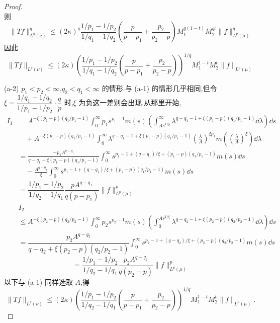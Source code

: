 \begin{proof}
\begin{equation*}
\end{equation*}
则
\begin{equation*}
\| Tf \|_{L^{q}(\nu)}^{q} \leq (2\kappa)^{q}\frac{1/p_{1} - 1/p_{2}}{1/q_{1} - 1/q_{2}}\left(\frac{p}{p - p_{1}} + \frac{p_{2}}{p_{2} - p}\right)M_{1}^{q(1-t)}M_{2}^{qt}\| f \|_{L^{p}(\mu)}^{q}
\end{equation*}
因此
\begin{equation*}
\| Tf \|_{L^{q}(\nu)} \leq (2\kappa)\left(\frac{1/p_{1} - 1/p_{2}}{1/q_{1} - 1/q_{2}}\left(\frac{p}{p - p_{1}} + \frac{p_{2}}{p_{2} - p}\right)\right)^{1/q}M_{1}^{1-t}M_{2}^{t}\| f \|_{L^{p}(\mu)}
\end{equation*}

(a-2) $p_{1} < p_{2} < \infty$,$q_{2} < q_{1} < \infty$ 的情形.与 (a-1) 的情形几乎相同,但令 $\xi = \dfrac{1/q_{1} - 1/q_{2}}{1/p_{1} - 1/p_{2}}\cdot\dfrac{q}{p}$ 时,$\xi$ 为负这一差别会出现.从那里开始,
\begin{align*}
I_{1}&= A^{-\xi(p_{1}-p)(q_{1}/p_{1}-1)}\displaystyle\int_{0}^{\infty}p_{1}s^{p_{1}-1}m(s)\left(\int_{As^{1/\xi}}^{\infty}\lambda^{q-q_{1}-1+\xi(p_{1}-p)(q_{1}/p_{1}-1)}\dd \lambda\right)\dd s  \\
&\quad + A^{-\xi(p_{1}-p)(q_{1}/p_{1}-1)}\displaystyle\int_{0}^{\infty}\lambda^{q-q_{1}-1+\xi(p_{1}-p)(q_{1}/p_{1}-1)}\left(\frac{\lambda}{A}\right)^{\xi p_{1}}m\left(\left(\frac{\lambda}{A}\right)^{\xi}\right)\dd \lambda \\
&= \frac{-p_{1}A^{q-q_{1}}}{q - q_{1} + \xi(p_{1}-p)(q_{1}/p_{1}-1)}\displaystyle\int_{0}^{\infty}s^{p_{1}-1+(q-q_{1})/\xi+(p_{1}-p)(q_{1}/p_{1}-1)}m(s)\dd s \\
&\quad - \frac{A^{q-q_{1}}}{\xi}\displaystyle\int_{0}^{\infty}s^{p_{1}-1+(q-q_{1})/\xi+(p_{1}-p)(q_{1}/p_{1}-1)}m(s)\dd s \\
&= \dfrac{1/p_{1} - 1/p_{2}}{1/q_{2} - 1/q_{1}}\dfrac{pA^{q-q_{1}}}{q(p - p_{1})}\| f \|_{L^{p}(\mu)}^{p}. \\
&I_{2} \\
&\leq A^{-\xi(p_{2}-p)(q_{2}/p_{2}-1)}\displaystyle\int_{0}^{\infty}p_{2}s^{p_{2}-1}m(s)\left(\int_{0}^{As^{1/\xi}}\lambda^{q-q_{2}-1+\xi(p_{2}-p)(q_{2}/p_{2}-1)}\dd \lambda\right)\dd s \\
&= \dfrac{p_{2}A^{q-q_{2}}}{q - q_{2} + \xi(p_{2}-p)(q_{2}/p_{2}-1)}\displaystyle\int_{0}^{\infty}s^{p_{2}-1+(q-q_{2})/\xi+(p_{2}-p)(q_{2}/p_{2}-1)}m(s)\dd s
\end{align*}
\begin{equation*}
= \frac{1/p_{1} - 1/p_{2}}{1/q_{2} - 1/q_{1}}\frac{p_{2}A^{q-q_{2}}}{q(p_{2} - p)}\| f \|_{L^{p}(\mu)}^{p}
\end{equation*}
以下与 (a-1) 同样选取 $A$,得
\begin{equation*}
\| Tf \|_{L^{q}(\nu)} \leq (2\kappa)\left(\frac{1/p_{1} - 1/p_{2}}{1/q_{2} - 1/q_{1}}\left(\frac{p}{p - p_{1}} + \frac{p_{2}}{p_{2} - p}\right)\right)^{1/q}M_{1}^{1-t}M_{2}^{t}\| f \|_{L^{p}(\mu)}.
\end{equation*}


\end{proof}
